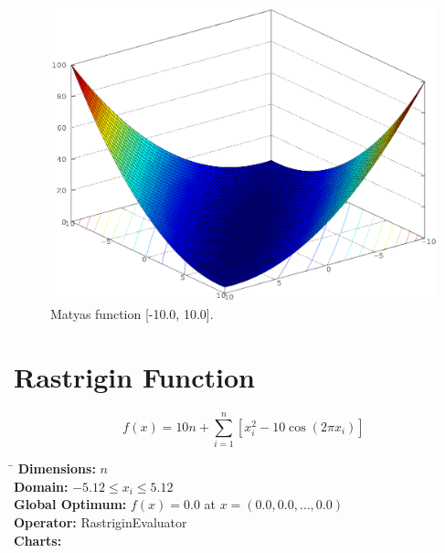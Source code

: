 \documentclass[12pt, a4paper]{article}
\begin{document}
		\begin{figure}[ht]
			\includegraphics[width=\textwidth]{Images/Matyas}
			\caption{Matyas function [-10.0, 10.0].}
		\end{figure}

	\newpage

	\section*{Rastrigin Function}
		\begin{equation*}
			f(x)=10n+\sum\limits_{i=1}^n[x_i^2-10\cos(2\pi x_i)]
		\end{equation*}

		\begin{tabbing}
			\hspace{5cm}\=\kill
			\textbf{Dimensions:}     \> $n$ \\
			\textbf{Domain:}         \> $-5.12 \leq x_i \leq 5.12$ \\
			\textbf{Global Optimum:} \> $f(x) = 0.0$ at $x = (0.0, 0.0, \dots, 0.0)$ \\
			\textbf{Operator:}       \> RastriginEvaluator \\
			\textbf{Charts:}         \> \\
		\end{tabbing}
\end{document}

